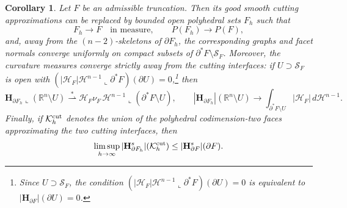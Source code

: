 \documentclass[reqno,11pt]{amsart}
\makeatletter
\newcommand{\R}{\mathbb R}
\newcommand{\HH}{\mathscr H}
\newtheorem{cor}[thm]{Corollary}%
\numberwithin{equation}{section}
\theoremstyle{remark}
\makeatother
\begin{document}
\begin{cor}\label{cor:piecewise polyhedral approximation}
Let $F$ be an admissible truncation. Then its good smooth cutting
approximations can be replaced by bounded open polyhedral sets $F_h$ such that
\[
F_h\to F\quad\text{in measure},\qquad P(F_h)\to P(F),
\]
and, away from the $(n-2)$-skeletons of $\partial F_h$, the corresponding graphs
and facet normals converge uniformly on compact subsets of
$\partial^*F\setminus\mathcal S_F$. Moreover, the curvature measures converge
strictly away from the cutting interfaces: if
$U\supset\mathcal S_F$ is open with
$(|\mathcal H_F|\HH^{n-1}\llcorner\partial^*F)(\partial U)=0$,\footnote{Since $U\supset\mathcal S_F$,
the condition $(|\mathcal H_F|\HH^{n-1}\llcorner\partial^*F)(\partial U)=0$ is equivalent to $|\mathbf H_{\partial F}|(\partial U)=0$.} then
\[
\mathbf H_{\partial F_h}\llcorner(\R^n\setminus U)
\stackrel{*}{\rightharpoonup}
\mathcal H_F\nu_F\,\HH^{n-1}\llcorner(\partial^*F\setminus U),
\qquad
|\mathbf H_{\partial F_h}|(\R^n\setminus U)
\to
\int_{\partial^*F\setminus U}|\mathcal H_F|\,d\HH^{n-1}.
\]
Finally, if $\mathcal K_h^{\rm cut}$ denotes the union of the polyhedral
codimension-two faces approximating the two cutting interfaces, then
\[
\limsup_{h\to\infty}|\mathbf H^s_{\partial F_h}|(\mathcal K_h^{\rm cut})
\le |\mathbf H^s_{\partial F}|(\partial F).
\]
\end{cor}
\end{document}
